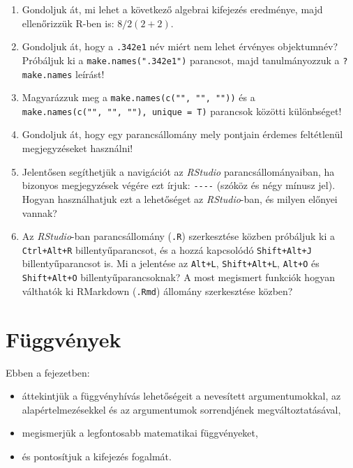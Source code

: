 \documentclass[
]{book}
\makeatletter
\providecommand{\tightlist}{%
  \setlength{\itemsep}{0pt}\setlength{\parskip}{0pt}}
\newenvironment{kframe}{%
\medskip{}
\setlength{\fboxsep}{.8em}
 \def\at@end@of@kframe{}%
 \ifinner\ifhmode%
  \def\at@end@of@kframe{\end{minipage}}%
  \begin{minipage}{\columnwidth}%
 \fi\fi%
 \def\FrameCommand##1{\hskip\@totalleftmargin \hskip-\fboxsep
 \colorbox{shadecolor}{##1}\hskip-\fboxsep
     \hskip-\linewidth \hskip-\@totalleftmargin \hskip\columnwidth}%
 \MakeFramed {\advance\hsize-\width
   \@totalleftmargin\z@ \linewidth\hsize
   \@setminipage}}%
 {\par\unskip\endMakeFramed%
 \at@end@of@kframe}
\newenvironment{rmdblock}[1]
  {
  \begin{itemize}
  \renewcommand{\labelitemi}{
    \raisebox{-.7\height}[0pt][0pt]{
      {\setkeys{Gin}{width=3em,keepaspectratio}\texttt{[image: images/\#1]}}
    }
  }
  \setlength{\fboxsep}{1em}
  \begin{kframe}
  \item
  }
  {
  \end{kframe}
  \end{itemize}
  }
\newenvironment{rmdlevel1}
  {\begin{rmdblock}{level1}}
  {\end{rmdblock}}
\newenvironment{rmdexercise}
  {\begin{rmdblock}{exercise}}
  {\end{rmdblock}}
\makeatother
\begin{document}
\begin{rmdexercise}
\begin{enumerate}
\def\labelenumi{\arabic{enumi}.}
\tightlist
\item
  Gondoljuk át, mi lehet a következő algebrai kifejezés eredménye, majd ellenőrizzük R-ben is: \(8/2(2+2)\).
\item
  Gondoljuk át, hogy a \texttt{.342e1} név miért nem lehet érvényes objektumnév? Próbáljuk ki a \texttt{make.names(".342e1")} parancsot, majd tanulmányozzuk a \texttt{?make.names} leírást!
\item
  Magyarázzuk meg a \texttt{make.names(c("",\ "",\ ""))} és a \texttt{make.names(c("",\ "",\ ""),\ unique\ =\ T)} parancsok közötti különbséget!
\item
  Gondoljuk át, hogy egy parancsállomány mely pontjain érdemes feltétlenül megjegyzéseket használni!
\item
  Jelentősen segíthetjük a navigációt az \emph{RStudio} parancsállományaiban, ha bizonyos megjegyzések végére ezt írjuk: \texttt{-\/-\/-\/-} (szóköz és négy mínusz jel). Hogyan használhatjuk ezt a lehetőséget az \emph{RStudio}-ban, és milyen előnyei vannak?
\item
  Az \emph{RStudio}-ban parancsállomány (\texttt{.R}) szerkesztése közben próbáljuk ki a \texttt{Ctrl+Alt+R} billentyűparancsot, és a hozzá kapcsolódó \texttt{Shift+Alt+J} billentyűparancsot is. Mi a jelentése az \texttt{Alt+L}, \texttt{Shift+Alt+L}, \texttt{Alt+O} és \texttt{Shift+Alt+O} billentyűparancsoknak? A most megismert funkciók hogyan válthatók ki RMarkdown (\texttt{.Rmd}) állomány szerkesztése közben?
\end{enumerate}
\end{rmdexercise}

\hypertarget{fuxfcggvuxe9nyek}{%
\section{Függvények}\label{fuxfcggvuxe9nyek}}

\begin{rmdlevel1}
Ebben a fejezetben:

\begin{itemize}
\tightlist
\item
  áttekintjük a függvényhívás lehetőségeit a nevesített argumentumokkal, az alapértelmezésekkel és az argumentumok sorrendjének megváltoztatásával,
\item
  megismerjük a legfontosabb matematikai függvényeket,
\item
  és pontosítjuk a kifejezés fogalmát.
\end{itemize}
\end{rmdlevel1}
\end{document}
